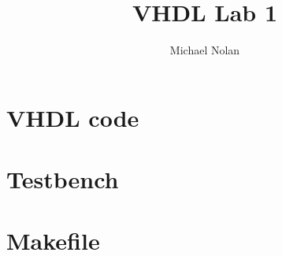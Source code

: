 \documentclass{article}
\title{VHDL Lab 1}
\author{Michael Nolan}
\begin{document}
\maketitle
\newpage

\section{VHDL code}


\newpage
\section{Testbench}


\newpage
\section{Makefile}

\end{document}
